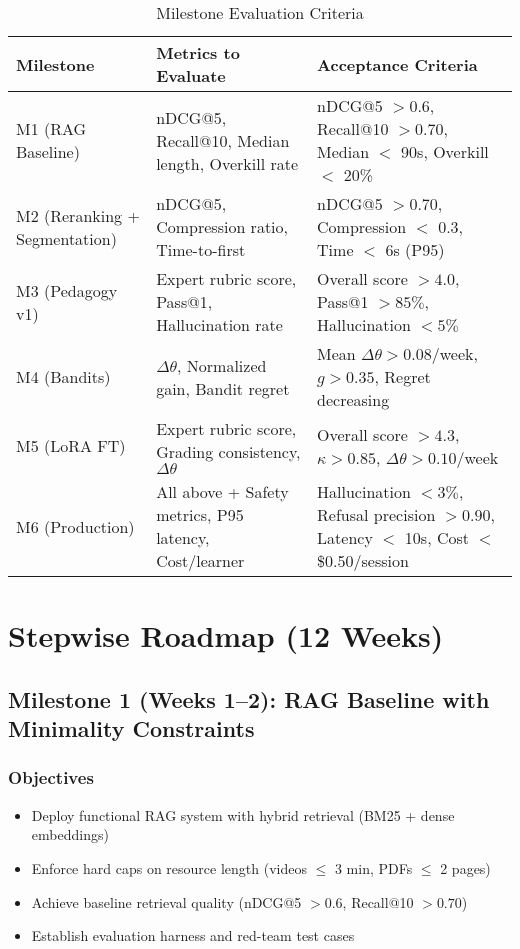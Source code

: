 \documentclass[11pt,letterpaper]{article}
\begin{document}
\begin{table}[H]
\centering
\small
\begin{tabular}{@{}p{2.5cm}p{6cm}p{5.5cm}@{}}
\toprule
\textbf{Milestone} & \textbf{Metrics to Evaluate} & \textbf{Acceptance Criteria} \\
\midrule
M1 (RAG Baseline) & nDCG@5, Recall@10, Median length, Overkill rate & nDCG@5 $> 0.6$, Recall@10 $> 0.70$, Median $<$ 90s, Overkill $<$ 20\% \\
M2 (Reranking + Segmentation) & nDCG@5, Compression ratio, Time-to-first & nDCG@5 $> 0.70$, Compression $<$ 0.3, Time $<$ 6s (P95) \\
M3 (Pedagogy v1) & Expert rubric score, Pass@1, Hallucination rate & Overall score $> 4.0$, Pass@1 $> 85\%$, Hallucination $< 5\%$ \\
M4 (Bandits) & $\Delta\theta$, Normalized gain, Bandit regret & Mean $\Delta\theta > 0.08$/week, $g > 0.35$, Regret decreasing \\
M5 (LoRA FT) & Expert rubric score, Grading consistency, $\Delta\theta$ & Overall score $> 4.3$, $\kappa > 0.85$, $\Delta\theta > 0.10$/week \\
M6 (Production) & All above + Safety metrics, P95 latency, Cost/learner & Hallucination $< 3\%$, Refusal precision $> 0.90$, Latency $<$ 10s, Cost $<$ \$0.50/session \\
\bottomrule
\end{tabular}
\caption{Milestone Evaluation Criteria}
\end{table}

\newpage

\section{Stepwise Roadmap (12 Weeks)}\label{sec:roadmap}

\subsection{Milestone 1 (Weeks 1--2): RAG Baseline with Minimality Constraints}\label{subsec:milestone-1}

\subsubsection{Objectives}\label{subsubsec:m1-objectives}
\begin{itemize}
\item Deploy functional RAG system with hybrid retrieval (BM25 + dense embeddings)
\item Enforce hard caps on resource length (videos $\leq$ 3 min, PDFs $\leq$ 2 pages)
\item Achieve baseline retrieval quality (nDCG@5 $> 0.6$, Recall@10 $> 0.70$)
\item Establish evaluation harness and red-team test cases
\end{itemize}
\end{document}
